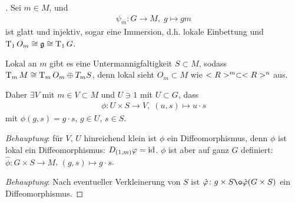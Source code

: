 \begin{proof}[]
	Sei $m\in M$, und \begin{align*}
		\psi_m\colon G\to M,\; g\mapsto gm
	\end{align*}
	ist glatt und injektiv, sogar eine Immersion, d.h. lokale Einbettung und $\operatorname{T}_1 O_m\cong \mathfrak g\cong \operatorname{T}_1 G$.
	
	Lokal an $m$ gibt es eine Untermannigfaltigkeit $S\subset M$, sodass $\operatorname{T}_m M\cong \operatorname{T}_m O_m\oplus T_m S$, denn lokal sieht $O_m\subset M$ wie $<R>^m\subset<R>^n$ aus.
	
	Daher $\exists V$ mit $m\in V\subset M$ und $U\ni 1$ mit $U\subset G$, dass\begin{align*}
		\phi\colon U\times S\to V,\; (u,s)\mapsto u\cdot s
	\end{align*}
	mit $\phi(g,s) = g\cdot s$, $g\in U$, $s\in S$.
	
	\emph{Behauptung}: für $V$, $U$ hinreichend klein ist $\phi$ ein Diffeomorphismus, denn $\phi$ ist lokal ein Diffeomorphismus: $D_{(1,m)}\varphi=\operatorname{id}$. $\phi$ ist aber auf ganz $G$ definiert: $\hat\phi\colon G\times S\to M$, $(g,s)\mapsto g\cdot s$.
	
	\emph{Behauptung}: Nach eventueller Verkleinerung von $S$ ist $\hat\phi\colon g\times S\o \hat\phi(G\times S)$ ein Diffeomorphismus.
	

\end{proof}
